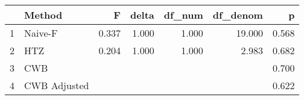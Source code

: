 \begin{table}[ht]
\centering
\begin{tabular}{rlrrrrr}
  \hline
 & Method & F & delta & df\_num & df\_denom & p \\ 
  \hline
1 & Naive-F & 0.337 & 1.000 & 1.000 & 19.000 & 0.568 \\ 
  2 & HTZ & 0.204 & 1.000 & 1.000 & 2.983 & 0.682 \\ 
  3 & CWB &  &  &  &  & 0.700 \\ 
  4 & CWB Adjusted &  &  &  &  & 0.622 \\ 
   \hline
\end{tabular}
\end{table}
